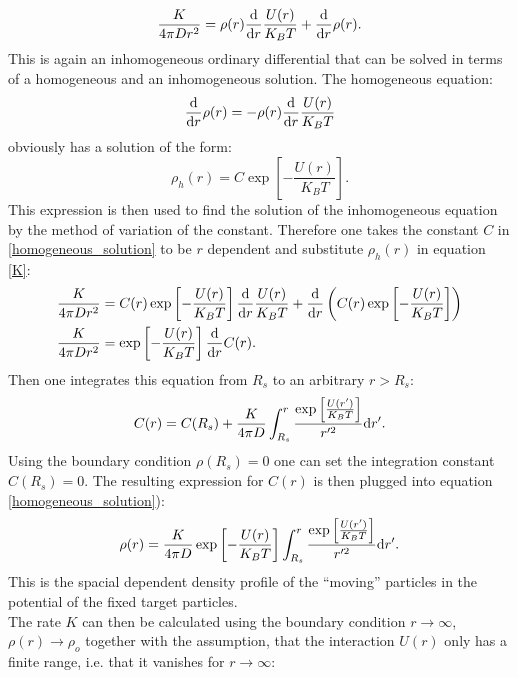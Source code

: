 \begin{equation}
    \frac{K}{4\pi D r^{2}} = \rho(r)\frac{\rm d}{ {\rm d}r} \frac{U(r)}{K_B T} + \frac{\rm d}{ {\rm d}r} \rho(r).
    \label{K}
\end{equation}
This is again an inhomogeneous ordinary differential that can be solved in terms of a homogeneous and an inhomogeneous solution. The homogeneous equation:
\begin{equation}
    \frac{\rm d}{{\rm d} r} \rho(r) = -\rho(r) \frac{\rm d}{ {\rm d} r} \frac{U(r)}{K_B T}
    \label{homogeneous_equation}
\end{equation}
obviously has a solution of the form:
\begin{equation}
    \rho_h(r) = C \exp \left[ - \frac{U(r)}{K_B T} \right].
    \label{homogeneous_solution}
\end{equation}
This expression is then used to find the solution of the inhomogeneous equation by the method of variation of the constant. Therefore one takes the constant $C$ in \eqref{homogeneous_solution} to be $r$ dependent and substitute $\rho_h(r)$ in equation \eqref{K}:
\begin{align}
    \frac{K}{4 \pi D r^2} &= C(r) \exp \left[ - \frac{U(r)}{K_B T} \right] \frac{\rm d}{ {\rm d} r} \frac{U(r)}{K_B T} + \frac{\rm d}{ {\rm d} r} \left( C(r) \exp \left[ - \frac{U(r)}{K_B T} \right] \right) \nonumber\\
    \frac{K}{ 4 \pi D r^2} &= \exp \left[ -\frac{U(r)}{K_B T} \right] \frac{\rm d }{ {\rm d} r} C(r).
    \label{equation_C(r)}
\end{align}
Then one integrates this equation from $R_s$ to an arbitrary $r>R_s$:
\begin{equation}
    C(r) = C(R_s) + \frac{K}{4 \pi D}\int_{R_s}^{r} \frac{\exp \left[ \frac{U(r')}{K_B T}\right]}{r'^2} {\rm d} r'.
    \label{solution_C(r)}
\end{equation}
Using the boundary condition $\rho(R_s)=0$ one can set the integration constant $C(R_s) = 0$. The resulting expression for $C(r)$ is then plugged into equation \eqref{homogeneous_solution}):
\begin{equation}
    \rho(r) = \frac{K}{4 \pi D}\exp \left[ -\frac{U(r)}{K_B T} \right] \int_{R_s}^{r} \frac{\exp \left[ \frac{U(r')}{K_B T}\right]}{r'^2} {\rm d} r'.
    \label{rho_debye}
\end{equation}
This is the spacial dependent density profile of the ``moving'' particles in the potential of the fixed target particles. \\
The rate $K$ can then be calculated using the boundary condition $r \rightarrow \infty$, $\rho(r) \rightarrow \rho_o$ together with the assumption, that the interaction $U(r)$ only has a finite range, i.e. that it vanishes for $r \rightarrow \infty$:
